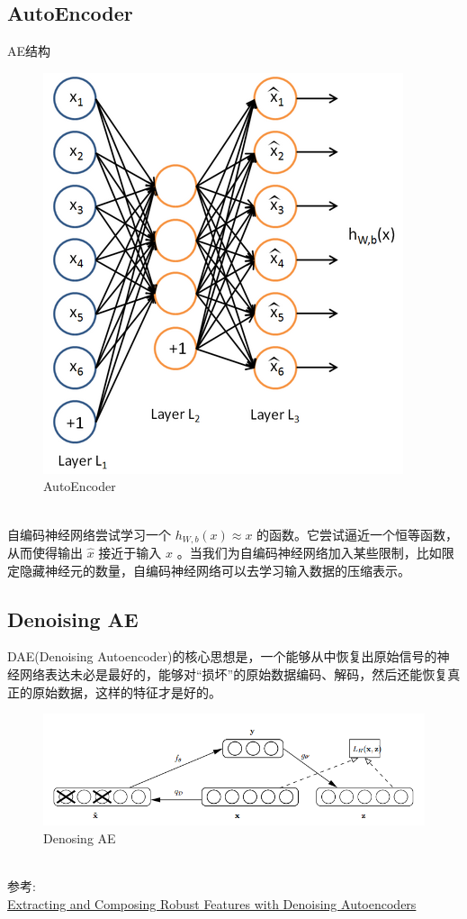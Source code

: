 \documentclass{article}
\begin{document}
\subsection{AutoEncoder}
AE结构
\begin{figure}[h]
\centering
\includegraphics[height=0.5\linewidth]{4.png}
\caption{AutoEncoder}
\end{figure}\\
自编码神经网络尝试学习一个 $\textstyle h_{W,b}(x) \approx x$ 的函数。它尝试逼近一个恒等函数，从而使得输出 $\textstyle \hat{x}$ 接近于输入 $\textstyle x$ 。当我们为自编码神经网络加入某些限制，比如限定隐藏神经元的数量，自编码神经网络可以去学习输入数据的压缩表示。
\subsection{Denoising AE}
DAE(Denoising Autoencoder)的核心思想是，一个能够从中恢复出原始信号的神经网络表达未必是最好的，能够对“损坏”的原始数据编码、解码，然后还能恢复真正的原始数据，这样的特征才是好的。
\begin{figure}[h]
\centering
\includegraphics[width=0.8\linewidth]{5.png}
\caption{Denosing AE}
\end{figure}\\
参考:\\
\href{https://www.researchgate.net/publication/221346269_Extracting_and_composing_robust_features_with_denoising_autoencoders}{Extracting and Composing Robust Features with
Denoising Autoencoders}
\end{document}
